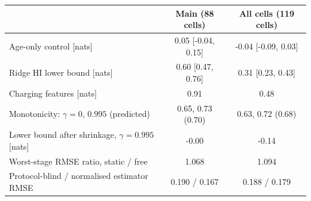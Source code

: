 \begin{tabular}{l c c}
\hline
 & Main (88 cells) & All cells (119 cells) \\
\hline
Age-only control [nats] & 0.05 [-0.04, 0.15] & -0.04 [-0.09, 0.03] \\
Ridge HI lower bound [nats] & 0.60 [0.47, 0.76] & 0.31 [0.23, 0.43] \\
Charging features [nats] & 0.91 & 0.48 \\
Monotonicity: $\gamma=0$, $0.995$ (predicted) & 0.65, 0.73 (0.70) & 0.63, 0.72 (0.68) \\
Lower bound after shrinkage, $\gamma=0.995$ [nats] & -0.00 & -0.14 \\
Worst-stage RMSE ratio, static / free & 1.068 & 1.094 \\
Protocol-blind / normalised estimator RMSE & 0.190 / 0.167 & 0.188 / 0.179 \\
\hline
\end{tabular}
